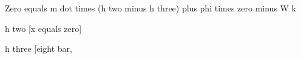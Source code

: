 Zero equals m dot times (h two minus h three) plus phi times zero minus W k

h two [x equals zero]

h three [eight bar,